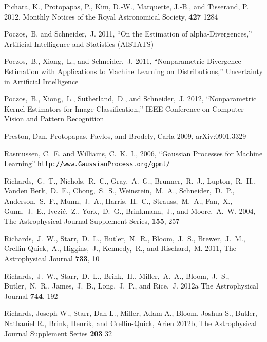 \documentclass[useAMS,usenatbib,tightenlines,11pt,preprint]{aastex}
\begin{document}
\begin{thebibliography}{99}
Pichara, K., Protopapas, P., Kim, D.-W., Marquette, J.-B., and Tisserand, P.
2012, Monthly Notices of the Royal Astronomical Society, {\bf 427} 1284

Poczos,~B. and Schneider,~J. 2011, ``On the Estimation of alpha-Divergences,''
Artificial Intelligence and Statistics (AISTATS)

Poczos,~B., Xiong,~L., and Schneider,~J. 2011, ``Nonparametric Divergence Estimation with
Applications to Machine Learning on Distributions,''  Uncertainty in Artificial
Intelligence

Poczos,~B., Xiong,~L., Sutherland,~D., and Schneider,~J. 2012,
``Nonparametric Kernel Estimators for Image Classification,''
IEEE Conference on Computer Vision and Pattern Recognition

Preston, Dan, Protopapas, Pavlos, and Brodely, Carla 2009, arXiv:0901.3329

Rasmussen, C.~E. and Williams, C.~K.~I., 2006, ``Gaussian
Processes for Machine Learning''
\verb|http://www.GaussianProcess.org/gpml/|

Richards,~G.~T., Nichols,~R.~C., Gray,~A.~G., Brunner,~R.~J., Lupton,~R.~H.,
Vanden Berk,~D.~E., Chong,~S.~S., Weinstein,~M.~A., Schneider,~D.~P.,
Anderson,~S.~F., Munn,~J.~A., Harris,~H.~C., Strauss,~M.~A., Fan,~X.,
Gunn,~J.~E., Ivezi\'c,~Z., York,~D.~G., Brinkmann,~J., and Moore,~A.~W. 2004,
The Astrophysical Journal Supplement Series, {\bf 155}, 257

Richards,~J.~W., Starr,~D.~L., Butler,~N.~R., Bloom,~J.~S., Brewer,~J.~M.,
Crellin-Quick,~A., Higgins,~J., Kennedy,~R., and Rischard,~M. 2011,
The Astrophysical Journal {\bf 733}, 10

Richards,~J.~W., Starr,~D.~L., Brink,~H., Miller,~A.~A., Bloom,~J.~S.,
Butler,~N.~R., James,~J.~B., Long,~J.~P., and Rice,~J. 2012a
The Astrophysical Journal {\bf 744}, 192

Richards, Joseph W., Starr, Dan L., Miller, Adam A., Bloom, Joshua S.,
Butler, Nathaniel R., Brink, Henrik, and Crellin-Quick, Arien 2012b,
The Astrophysical Journal Supplement Series {\bf 203} 32


\end{thebibliography}
\end{document}
